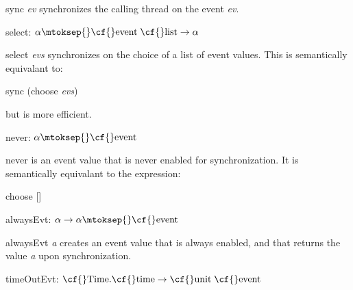 \begin{descr}
\begin{speccomment}
\item {\cf \small sync \mbox{\cf \small \textit{ev}}           } 
synchronizes the calling thread on the event \mbox{\cf \small \textit{ev}}.     \end{speccomment}
\item {}{} {\cf select: \(\alpha\mtoksep{}\mbox{\cf{}event}\;\mbox{\cf{}list}\rightarrow \alpha\)}\label{val-CML.select}


\begin{speccomment}
\item {\cf \small select \mbox{\cf \small \textit{evs}}           } 
synchronizes on the choice of a list of event values. 	  This is semantically equivalant to: 	  
\begin{code}
	    sync (choose \mbox{\cf \small \textit{evs}})
	  
\end{code}
 	  but is more efficient.     \end{speccomment}
\item {}{} {\cf never: \(\alpha\mtoksep{}\mbox{\cf{}event}\)}\label{val-CML.never}


\begin{speccomment}
\item {\cf \small never           } 
is an event value that is never enabled for synchronization. 	  It is semantically equivalant to the expression: 	  
\begin{code}
	    choose []
	  
\end{code}
     \end{speccomment}
\item {}{} {\cf alwaysEvt: \(\alpha\rightarrow \alpha\mtoksep{}\mbox{\cf{}event}\)}\label{val-CML.alwaysEvt}


\begin{speccomment}
\item {\cf \small always\-Evt \mbox{\cf \small \textit{a}}           } 
creates an event value that is always enabled, and that returns 	  the value \mbox{\cf \small \textit{a}} upon synchronization.     \end{speccomment}
\item {}{} {\cf timeOutEvt: \(\mbox{\cf{}Time}.\mbox{\cf{}time}\rightarrow \mbox{\cf{}unit}\;\mbox{\cf{}event}\)}\label{val-CML.timeOutEvt}



\end{descr}
